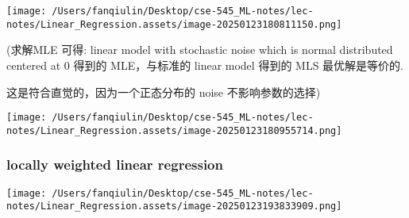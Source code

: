 \documentclass[
]{article}
\begin{document}
\texttt{[image: /Users/fanqiulin/Desktop/cse-545\_ML-notes/lec-notes/Linear\_Regression.assets/image-20250123180811150.png]}

(求解MLE 可得: linear model with stochastic noise which is normal
distributed centered at 0 得到的 MLE，与标准的 linear model 得到的 MLS
最优解是等价的.

这是符合直觉的，因为一个正态分布的 noise 不影响参数的选择)

\texttt{[image: /Users/fanqiulin/Desktop/cse-545\_ML-notes/lec-notes/Linear\_Regression.assets/image-20250123180955714.png]}

\hypertarget{locally-weighted-linear-regression}{%
\subsubsection{\texorpdfstring{locally weighted linear regression
}{locally weighted linear regression }}\label{locally-weighted-linear-regression}}

\texttt{[image: /Users/fanqiulin/Desktop/cse-545\_ML-notes/lec-notes/Linear\_Regression.assets/image-20250123193833909.png]}
\end{document}
